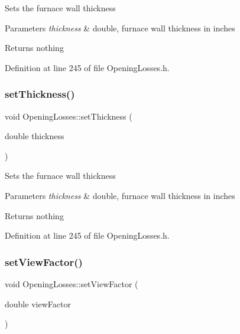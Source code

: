 Sets the furnace wall thickness


\begin{DoxyParams}{Parameters}
{\em thickness} & double, furnace wall thickness in inches\\
\hline
\end{DoxyParams}
\begin{DoxyReturn}{Returns}
nothing 
\end{DoxyReturn}


Definition at line 245 of file Opening\+Losses.\+h.

\mbox{\label{class_opening_losses_a221cc88072e4f0975f15c6cd96781dea}} 
\subsubsection{\texorpdfstring{set\+Thickness()}{setThickness()}\hspace{0.1cm}{\footnotesize\ttfamily [3/3]}}
{\footnotesize\ttfamily void Opening\+Losses\+::set\+Thickness (\begin{DoxyParamCaption}\item[{double}]{thickness }\end{DoxyParamCaption})\hspace{0.3cm}{\ttfamily [inline]}}

Sets the furnace wall thickness


\begin{DoxyParams}{Parameters}
{\em thickness} & double, furnace wall thickness in inches\\
\hline
\end{DoxyParams}
\begin{DoxyReturn}{Returns}
nothing 
\end{DoxyReturn}


Definition at line 245 of file Opening\+Losses.\+h.

\mbox{\label{class_opening_losses_a4e6c6f1549e01cd4b82b7505e403d643}} 
\subsubsection{\texorpdfstring{set\+View\+Factor()}{setViewFactor()}\hspace{0.1cm}{\footnotesize\ttfamily [1/3]}}
{\footnotesize\ttfamily void Opening\+Losses\+::set\+View\+Factor (\begin{DoxyParamCaption}\item[{double}]{view\+Factor }\end{DoxyParamCaption})\hspace{0.3cm}{\ttfamily [inline]}}

